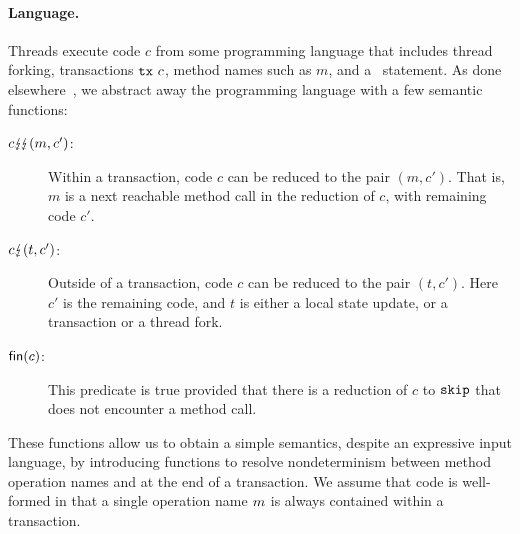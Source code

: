 \paragraph{Language.}

Threads execute code $c$ from some programming language that
includes thread forking, transactions $\texttt{tx}\ c$,
method names such as $m$, and a \skipt\ statement. As done
elsewhere~\cite{pmpy}, we abstract away the programming
  language with a few semantic functions: 
%
\begin{description}
\item[$c \lightning\!\lightning (m,c')$:] Within a transaction, code $c$ can be reduced to the pair
  $(m,c')$.  That is, $m$ is a next reachable method call in the
  reduction of $c$, with remaining code $c'$.

\item[$c \lightning (t,c')$:] Outside of a transaction, code $c$ can be reduced to the pair
  $(t,c')$.  Here $c'$ is the remaining code, and $t$ is either
  a local state update, or a transaction or a thread fork.

\item[$\textsf{fin}(c)$:] This predicate is true provided that there is a
  reduction of $c$ to $\texttt{skip}$ that does not encounter a method call.
\end{description}
%
These functions allow us to obtain a simple semantics, despite an
expressive input language, by introducing functions to resolve
nondeterminism between method operation names and at the end of a
transaction.
%
We assume that code is well-formed in that a single operation name $m$ 
is always contained within a transaction. 




